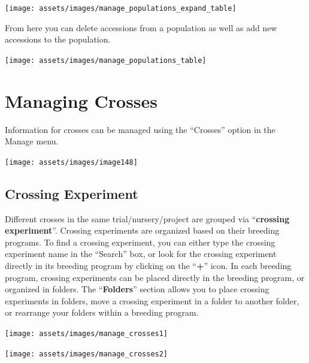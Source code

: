 \documentclass[
  12pt,
]{book}
\begin{document}
\begin{center}\texttt{[image: assets/images/manage\_populations\_expand\_table]} \end{center}

From here you can delete accessions from a population as well as add new accessions to the population.

\begin{center}\texttt{[image: assets/images/manage\_populations\_table]} \end{center}

\hypertarget{managing-crosses}{%
\chapter{Managing Crosses}\label{managing-crosses}}

Information for crosses can be managed using the ``Crosses'' option in the Manage menu.

\begin{center}\texttt{[image: assets/images/image148]} \end{center}

\hypertarget{crossing-experiment}{%
\section{Crossing Experiment}\label{crossing-experiment}}

Different crosses in the same trial/nursery/project are grouped via ``\textbf{crossing experiment}''. Crossing experiments are organized based on their breeding programs. To find a crossing experiment, you can either type the crossing experiment name in the ``Search'' box, or look for the crossing experiment directly in its breeding program by clicking on the ``\textbf{+}'' icon. In each breeding program, crossing experiments can be placed directly in the breeding program, or organized in folders. The ``\textbf{Folders}'' section allows you to place crossing experiments in folders, move a crossing experiment in a folder to another folder, or rearrange your folders within a breeding program.

\begin{center}\texttt{[image: assets/images/manage\_crosses1]} \end{center}

\begin{center}\texttt{[image: assets/images/manage\_crosses2]} \end{center}
\end{document}
